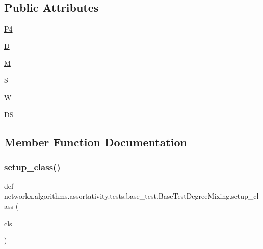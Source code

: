 \subsection*{Public Attributes}
\begin{DoxyCompactItemize}
\item 
\hyperlink{classnetworkx_1_1algorithms_1_1assortativity_1_1tests_1_1base__test_1_1BaseTestDegreeMixing_a2288a88e31b680b5b6b8c86e7a01ce1c}{P4}
\item 
\hyperlink{classnetworkx_1_1algorithms_1_1assortativity_1_1tests_1_1base__test_1_1BaseTestDegreeMixing_a67689338da662d48a2ffb49289b4e2de}{D}
\item 
\hyperlink{classnetworkx_1_1algorithms_1_1assortativity_1_1tests_1_1base__test_1_1BaseTestDegreeMixing_ae579b3a893060faed4baeea52cc5b555}{M}
\item 
\hyperlink{classnetworkx_1_1algorithms_1_1assortativity_1_1tests_1_1base__test_1_1BaseTestDegreeMixing_a258d3ade264400845ecc75a859b3be5a}{S}
\item 
\hyperlink{classnetworkx_1_1algorithms_1_1assortativity_1_1tests_1_1base__test_1_1BaseTestDegreeMixing_a055fdaaa2c8ee2a08ebcda8f6f6a2939}{W}
\item 
\hyperlink{classnetworkx_1_1algorithms_1_1assortativity_1_1tests_1_1base__test_1_1BaseTestDegreeMixing_a856099ef0b077934abd469042658fd1a}{DS}
\end{DoxyCompactItemize}


\subsection{Member Function Documentation}
\mbox{\label{classnetworkx_1_1algorithms_1_1assortativity_1_1tests_1_1base__test_1_1BaseTestDegreeMixing_a06821c6eb723ee9ee79314e3fa452a75}} 
\subsubsection{\texorpdfstring{setup\+\_\+class()}{setup\_class()}}
{\footnotesize\ttfamily def networkx.\+algorithms.\+assortativity.\+tests.\+base\+\_\+test.\+Base\+Test\+Degree\+Mixing.\+setup\+\_\+class (\begin{DoxyParamCaption}\item[{}]{cls }\end{DoxyParamCaption})}



